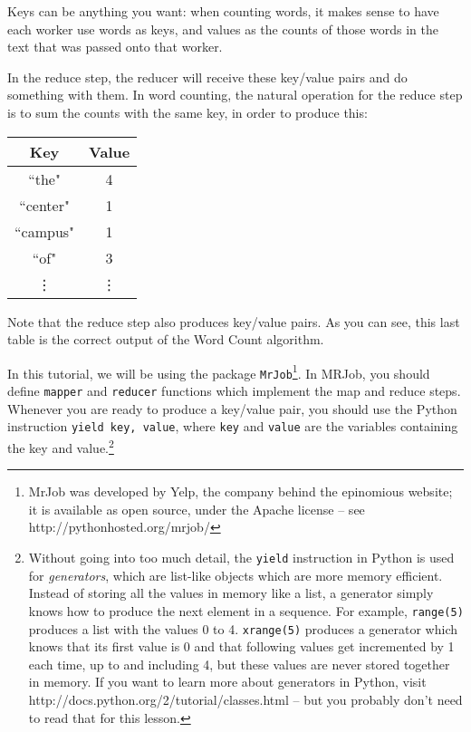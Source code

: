 Keys can be anything you want: when counting words, it makes sense to have each worker use words as keys, and values as the counts of those words in the text that was passed onto that worker.

In the reduce step, the reducer will receive these key/value pairs and do something with them. In word counting, the natural operation for the reduce step is to sum the counts with the same key, in order to produce this:

\begin{center}
\begin{tabular}{|c|c|}
\hline
Key & Value \\
\hline\hline
``the" & 4 \\
``center" & 1 \\
``campus" & 1 \\
``of" & 3\\
\vdots & \vdots \\
\end{tabular}
\end{center}

Note that the reduce step also produces key/value pairs. As you can see, this last table is the correct output of the Word Count algorithm.

In this tutorial, we will be using the package \texttt{MrJob}\footnote{MrJob was developed by Yelp, the company behind the epinomious website; it is available
as open source, under the Apache license -- see http://pythonhosted.org/mrjob/}. In MRJob, you should define \texttt{mapper} and \texttt{reducer} functions which implement the map and reduce steps. Whenever you are ready to produce a key/value pair, you should use the Python instruction \texttt{yield key, value}, where \texttt{key} and \texttt{value} are the variables containing the key and value.\footnote{Without going into too much detail, the \texttt{yield} instruction in Python is used for \emph{generators}, which are list-like objects which are more memory efficient. Instead of storing all the values in memory like a list, a generator simply knows how to produce the next element in a sequence. For example, \texttt{range(5)} produces a list with the values 0 to 4. \texttt{xrange(5)} produces a generator which knows that its first value is 0 and that following values get incremented by 1 each time, up to and including 4, but these values are never stored together in memory. If you want to learn more about generators in Python, visit http://docs.python.org/2/tutorial/classes.html -- but you probably don't need to read that for this lesson.}

